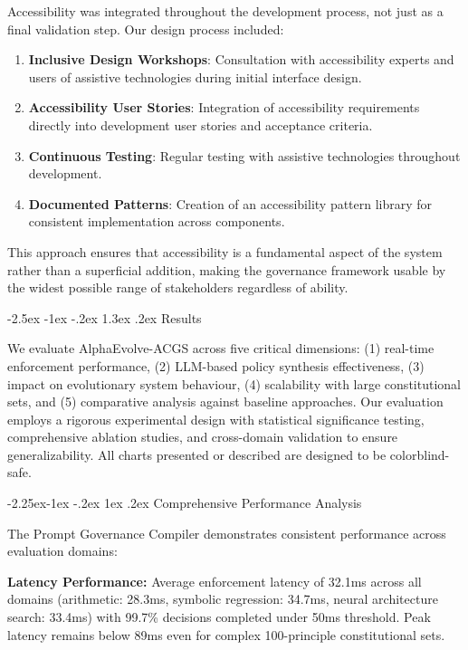 \documentclass[manuscript,screen,review,anonymous,9pt]{acmart}
\makeatletter
\renewcommand\section{\@startsection{section}{1}{\z@}%
  {-2.5ex \@plus -1ex \@minus -.2ex}%
  {1.3ex \@plus.2ex}%
  {\normalfont\Large\bfseries}}
\renewcommand\subsection{\@startsection{subsection}{2}{\z@}%
  {-2.25ex\@plus -1ex \@minus -.2ex}%
  {1ex \@plus .2ex}%
  {\normalfont\large\bfseries}}
\makeatother
\begin{document}
Accessibility was integrated throughout the development process, not just as a final validation step. Our design process included:

\begin{enumerate}
    \item \textbf{Inclusive Design Workshops}: Consultation with accessibility experts and users of assistive technologies during initial interface design.
    \item \textbf{Accessibility User Stories}: Integration of accessibility requirements directly into development user stories and acceptance criteria.
    \item \textbf{Continuous Testing}: Regular testing with assistive technologies throughout development.
    \item \textbf{Documented Patterns}: Creation of an accessibility pattern library for consistent implementation across components.
\end{enumerate}

This approach ensures that accessibility is a fundamental aspect of the system rather than a superficial addition, making the governance framework usable by the widest possible range of stakeholders regardless of ability.

\section{Results}
\label{sec:results}

We evaluate AlphaEvolve-ACGS across five critical dimensions: (1) real-time enforcement performance, (2) LLM-based policy synthesis effectiveness, (3) impact on evolutionary system behaviour, (4) scalability with large constitutional sets, and (5) comparative analysis against baseline approaches. Our evaluation employs a rigorous experimental design with statistical significance testing, comprehensive ablation studies, and cross-domain validation to ensure generalizability. All charts presented or described are designed to be colorblind-safe.

\subsection{Comprehensive Performance Analysis}
\label{subsec:comprehensive_performance_analysis}

The Prompt Governance Compiler demonstrates consistent performance across evaluation domains:

\textbf{Latency Performance:} Average enforcement latency of 32.1ms across all domains (arithmetic: 28.3ms, symbolic regression: 34.7ms, neural architecture search: 33.4ms) with 99.7\% decisions completed under 50ms threshold. Peak latency remains below 89ms even for complex 100-principle constitutional sets.
\end{document}
